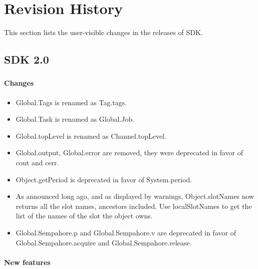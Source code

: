 \chapter{Revision History}
\label{sec:news}

This section lists the user-visible changes in the releases of \urbi
SDK.

\section{\urbi SDK 2.0}

\subsection{\us}

\subsubsection{Changes}

\begin{itemize}
\item Global.Tags is renamed as Tag.tags.

\item Global.Task is renamed as Global.Job.

\item Global.topLevel is renamed as Channel.topLevel.

\item Global.output, Global.error are removed, they were deprecated in
  favor of cout and cerr.

\item Object.getPeriod is deprecated in favor of System.period.

\item As announced long ago, and as displayed by warnings,
  Object.slotNames now returns all the slot names, ancestors included.
  Use localSlotNames to get the list of the names of the slot the
  object owns.

\item Global.Sempahore.p and Global.Sempahore.v are deprecated in favor of
  Global.Sempahore.acquire and Global.Sempahore.release.
\end{itemize}

\subsubsection{New features}

